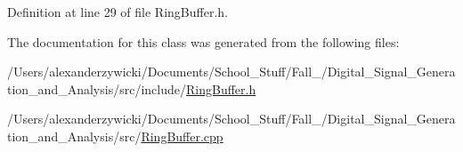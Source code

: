 Definition at line 29 of file Ring\+Buffer.\+h.



The documentation for this class was generated from the following files\+:\begin{DoxyCompactItemize}
\item 
/\+Users/alexanderzywicki/\+Documents/\+School\+\_\+\+Stuff/\+Fall\+\_/\+Digital\+\_\+\+Signal\+\_\+\+Generation\+\_\+and\+\_\+\+Analysis/src/include/\hyperlink{RingBuffer_8h}{Ring\+Buffer.\+h}\item 
/\+Users/alexanderzywicki/\+Documents/\+School\+\_\+\+Stuff/\+Fall\+\_/\+Digital\+\_\+\+Signal\+\_\+\+Generation\+\_\+and\+\_\+\+Analysis/src/\hyperlink{RingBuffer_8cpp}{Ring\+Buffer.\+cpp}\end{DoxyCompactItemize}
